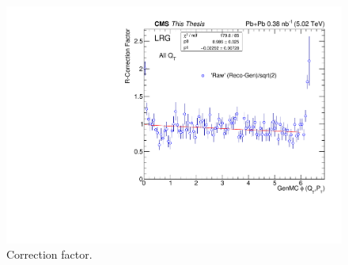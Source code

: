 \begin{figure}[h!]
\begin{centering}
\includegraphics[width=5in]{Chapter7/importfigs/rcorr_sys_thesis.pdf}
\par\end{centering}
\caption{Correction factor. \label{fig:rcorrSys}}
\end{figure}